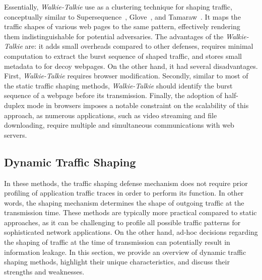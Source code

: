 Essentially, \textit{Walkie-Talkie} use as a clustering technique for shaping traffic, conceptually similar to Supersequence~\cite{wang2014supersequence}, Glove~\cite{nithyanand2014glove}, and Tamaraw~\cite{cai2014systematic}.
It maps the traffic shapes of various web pages to the same pattern, effectively rendering them indistinguishable for potential adversaries.
The advantages of the \textit{Walkie-Talkie} are: it adds small overheads compared to other defenses, requires minimal computation to extract the burst sequence of shaped traffic, and stores small metadata to for decoy webpages.
On the other hand, it had several disadvantages. 
First, \textit{Walkie-Talkie} requires browser modification.  
Secondly, similar to most of the static traffic shaping methods, \textit{Walkie-Talkie} should identify the burst sequence of a webpage before its transmission.
Finally, the adoption of half-duplex mode in browsers imposes a notable constraint on the scalability of this approach, as numerous applications, such as video streaming and file downloading, require multiple and simultaneous communications with web servers.



\subsection{Dynamic Traffic Shaping}\label{subsec:dynamic-traffic-shaping}
In these methods, the traffic shaping defense mechanism does not require prior profiling of application traffic traces in order to perform its function.  
In other words, the shaping mechanism determines the shape of outgoing traffic at the transmission time.
These methods are typically more practical compared to static approaches, as it can be challenging to profile all possible traffic patterns for sophisticated network applications.
On the other hand, ad-hoc decisions regarding the shaping of traffic at the time of transmission can potentially result in information leakage.
In this section, we provide an overview of dynamic traffic shaping methods, highlight their unique characteristics, and discuss their strengths and weaknesses.

